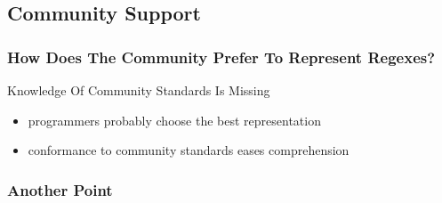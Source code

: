 \subsection{Community Support}

{
\begin{frame}
\frametitle{How Does The Community Prefer To Represent Regexes?}
\begin{block}{\begin{Large}Knowledge Of Community Standards Is Missing\end{Large}}
\begin{itemize}
\item \begin{large}programmers probably choose the best representation\end{large}
\item \begin{large}conformance to community standards eases comprehension\end{large}
\end{itemize}
\end{block}
\end{frame}
}



\begin{frame}
\frametitle{Another Point}
\end{frame}

